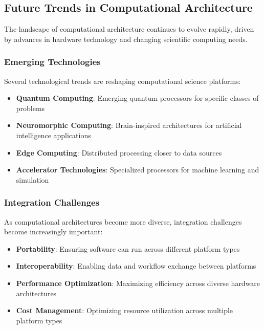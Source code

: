 \subsection{Future Trends in Computational Architecture}

The landscape of computational architecture continues to evolve rapidly, driven by advances in hardware technology and changing scientific computing needs.

\subsubsection{Emerging Technologies}

Several technological trends are reshaping computational science platforms:

\begin{itemize}
    \item \textbf{Quantum Computing}: Emerging quantum processors for specific classes of problems
    \item \textbf{Neuromorphic Computing}: Brain-inspired architectures for artificial intelligence applications
    \item \textbf{Edge Computing}: Distributed processing closer to data sources
    \item \textbf{Accelerator Technologies}: Specialized processors for machine learning and simulation
\end{itemize}

\subsubsection{Integration Challenges}

As computational architectures become more diverse, integration challenges become increasingly important:

\begin{itemize}
    \item \textbf{Portability}: Ensuring software can run across different platform types
    \item \textbf{Interoperability}: Enabling data and workflow exchange between platforms
    \item \textbf{Performance Optimization}: Maximizing efficiency across diverse hardware architectures
    \item \textbf{Cost Management}: Optimizing resource utilization across multiple platform types
\end{itemize}

